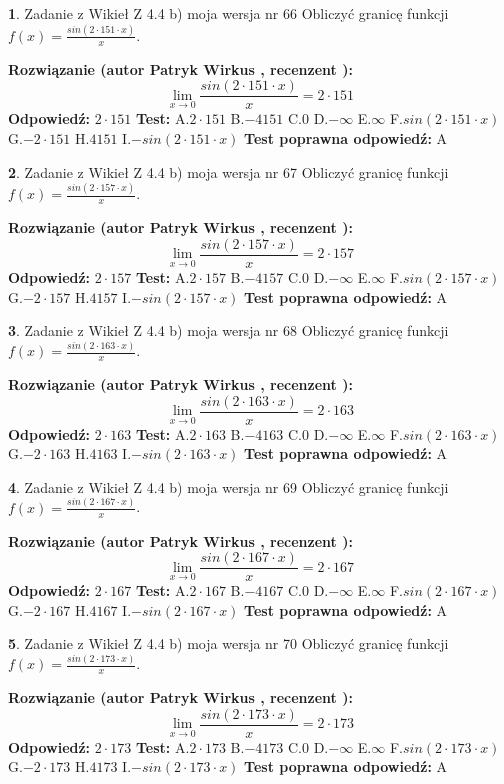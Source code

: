 \documentclass[12pt, a4paper]{article}
\theoremstyle{definition} %
\newtheorem{zad}{}
\newcommand{\zadStart}[1]{\begin{zad}#1\newline}
\newcommand{\zadStop}{\end{zad}}
\newcommand{\rozwStart}[2]{\noindent \textbf{Rozwiązanie (autor #1 , recenzent #2): }\newline}
\newcommand{\rozwStop}{\newline}
\newcommand{\odpStart}{\noindent \textbf{Odpowiedź:}\newline}
\newcommand{\odpStop}{\newline}
\newcommand{\testStart}{\noindent \textbf{Test:}\newline}
\newcommand{\testStop}{\newline}
\newcommand{\kluczStart}{\noindent \textbf{Test poprawna odpowiedź:}\newline}
\newcommand{\kluczStop}{\newline}
\begin{document}
\zadStart{Zadanie z Wikieł Z 4.4 b) moja wersja nr 66}
Obliczyć granicę funkcji $f(x)=\frac{sin(2 \cdot151\cdot x)}{x}$.
\zadStop
\rozwStart{Patryk Wirkus}{}
$$\lim\limits_{x\to 0}\frac{sin(2 \cdot 151\cdot x)}{x}=
2 \cdot 151$$
\rozwStop
\odpStart
$2 \cdot 151$
\odpStop
\testStart
A.$2 \cdot 151$
B.$-4151$
C.$0$
D.$-\infty$
E.$\infty$
F.$sin(2 \cdot 151\cdot x)$
G.$-2 \cdot 151$
H.$4151$
I.$-sin(2 \cdot 151\cdot x)$
\testStop
\kluczStart
A
\kluczStop



\zadStart{Zadanie z Wikieł Z 4.4 b) moja wersja nr 67}
Obliczyć granicę funkcji $f(x)=\frac{sin(2 \cdot157\cdot x)}{x}$.
\zadStop
\rozwStart{Patryk Wirkus}{}
$$\lim\limits_{x\to 0}\frac{sin(2 \cdot 157\cdot x)}{x}=
2 \cdot 157$$
\rozwStop
\odpStart
$2 \cdot 157$
\odpStop
\testStart
A.$2 \cdot 157$
B.$-4157$
C.$0$
D.$-\infty$
E.$\infty$
F.$sin(2 \cdot 157\cdot x)$
G.$-2 \cdot 157$
H.$4157$
I.$-sin(2 \cdot 157\cdot x)$
\testStop
\kluczStart
A
\kluczStop



\zadStart{Zadanie z Wikieł Z 4.4 b) moja wersja nr 68}
Obliczyć granicę funkcji $f(x)=\frac{sin(2 \cdot163\cdot x)}{x}$.
\zadStop
\rozwStart{Patryk Wirkus}{}
$$\lim\limits_{x\to 0}\frac{sin(2 \cdot 163\cdot x)}{x}=
2 \cdot 163$$
\rozwStop
\odpStart
$2 \cdot 163$
\odpStop
\testStart
A.$2 \cdot 163$
B.$-4163$
C.$0$
D.$-\infty$
E.$\infty$
F.$sin(2 \cdot 163\cdot x)$
G.$-2 \cdot 163$
H.$4163$
I.$-sin(2 \cdot 163\cdot x)$
\testStop
\kluczStart
A
\kluczStop



\zadStart{Zadanie z Wikieł Z 4.4 b) moja wersja nr 69}
Obliczyć granicę funkcji $f(x)=\frac{sin(2 \cdot167\cdot x)}{x}$.
\zadStop
\rozwStart{Patryk Wirkus}{}
$$\lim\limits_{x\to 0}\frac{sin(2 \cdot 167\cdot x)}{x}=
2 \cdot 167$$
\rozwStop
\odpStart
$2 \cdot 167$
\odpStop
\testStart
A.$2 \cdot 167$
B.$-4167$
C.$0$
D.$-\infty$
E.$\infty$
F.$sin(2 \cdot 167\cdot x)$
G.$-2 \cdot 167$
H.$4167$
I.$-sin(2 \cdot 167\cdot x)$
\testStop
\kluczStart
A
\kluczStop



\zadStart{Zadanie z Wikieł Z 4.4 b) moja wersja nr 70}
Obliczyć granicę funkcji $f(x)=\frac{sin(2 \cdot173\cdot x)}{x}$.
\zadStop
\rozwStart{Patryk Wirkus}{}
$$\lim\limits_{x\to 0}\frac{sin(2 \cdot 173\cdot x)}{x}=
2 \cdot 173$$
\rozwStop
\odpStart
$2 \cdot 173$
\odpStop
\testStart
A.$2 \cdot 173$
B.$-4173$
C.$0$
D.$-\infty$
E.$\infty$
F.$sin(2 \cdot 173\cdot x)$
G.$-2 \cdot 173$
H.$4173$
I.$-sin(2 \cdot 173\cdot x)$
\testStop
\kluczStart
A
\kluczStop
\end{document}
